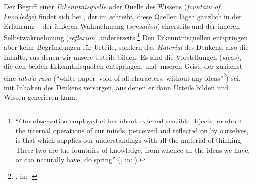 Der Begriff einer \emph{Erkenntnisquelle} oder Quelle des Wissens (\emph{fountain of
knowledge}) findet sich bei , der im  schreibt, diese Quellen lägen gänzlich in der
Erfahrung -- der äußeren Wahrnehmung (\emph{sensation}) einerseits und der
inneren Selbstwahrnehmung (\emph{reflexion}) andererseits.\footnote{\enquote{Our
observation employed either about external sensible objects, or about the
internal operations of our minds, perceived and reflected on by ourselves, is
that which supplies our understandings with all the material of thinking.
These two are the fountains of knowledge, from whence all the ideas we have,
or can naturally have, do spring} \mkbibparens{\cite[][Buch II, Kap.
I, \S~2]{Locke:AnEssayConcerningHumanUnderstanding1963}, in: \cite[][I:
82\,f.]{Locke:TheWorksofJohnLocke1963}}.} Den Erkenntnisquellen entspringen aber
keine Begründungen für Urteile, sondern das \emph{Material} des Denkens, also
die Inhalte, aus denen wir unsere Urteile bilden. Es sind die Vorstellungen
(\emph{ideas}), die den beiden Erkenntnisquellen entspringen, und unseren Geist,
der zunächst eine \emph{tabula rasa} (\enquote{white paper, void of all
characters, without any ideas}\footnote{\cite[][Buch II, Kap.
I, \S~2]{Locke:AnEssayConcerningHumanUnderstanding1963}, in: \cite[][I:
82\,f.]{Locke:TheWorksofJohnLocke1963}.}) sei, mit Inhalten des Denkens
versorgen, aus denen er dann Urteile bilden und Wissen generieren kann.

